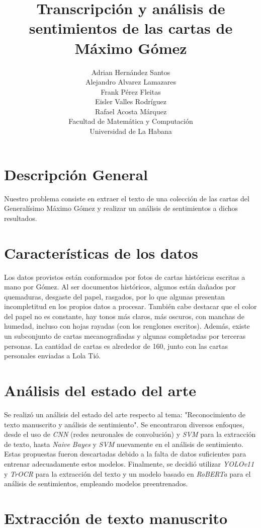 \documentclass[11pt,a4paper]{article}
\title{Transcripción y análisis de sentimientos de las cartas de Máximo Gómez}
\author{
    Adrian Hernández Santos\\
    Alejandro Alvarez Lamazares\\
    Frank Pérez Fleitas\\
    Eisler Valles Rodríguez\\
    \vspace{5cm}
    Rafael Acosta Márquez\\
    \small{Facultad de Matemática y Computación}\\
    \small{Universidad de La Habana}
}
\begin{document}
\maketitle

\newpage

\section{Descripción General}
Nuestro problema consiste en extraer el texto de una colección de las cartas del Generalísimo Máximo Gómez y realizar un análisis de sentimientos a dichos resultados.

\section{Características de los datos}
Los datos provistos están conformados por fotos de cartas históricas escritas a mano por Gómez. 
Al ser documentos históricos, algunos están dañados por quemaduras, desgaste del papel, rasgados, por lo que algunas presentan incompletitud en los propios datos a procesar. 
También cabe destacar que el color del papel no es constante, hay tonos más claros, más oscuros, con manchas de humedad, incluso con hojas rayadas (con los renglones escritos). 
Además, existe un subconjunto de cartas mecanografiadas y algunas completadas por terceras personas. 
La cantidad de cartas es alrededor de 160, junto con las cartas personales enviadas a Lola Tió.

\section{Análisis del estado del arte}
Se realizó un análisis del estado del arte respecto al tema: "Reconocimiento de texto manuscrito y análisis de sentimiento". 
Se encontraron diversos enfoques, desde el uso de \textit{CNN} (redes neuronales de convolución) y \textit{SVM} para la extracción de texto, hasta \textit{Naive Bayes} y \textit{SVM} nuevamente en el análisis de sentimiento. 
Estas propuestas fueron descartadas debido a la falta de datos suficientes para entrenar adecuadamente estos modelos. 
Finalmente, se decidió utilizar \textit{YOLOv11} y \textit{TrOCR} para la extracción del texto y un modelo basado en \textit{RoBERTa} para el análisis de sentimientos, empleando modelos preentrenados.

\section{Extracción de texto manuscrito}
\end{document}
